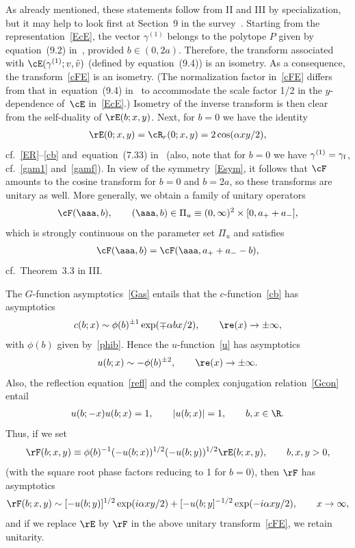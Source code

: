 As already mentioned, these statements follow from II and III by specialization, but it may help to look f\/irst at Section~9 in the survey~\cite{Rsurv}. Starting from the representation~\eqref{EcE}, the
vector $\gamma^{(1)}$ belongs to the polytope $P$ given by equation~(9.2) in~\cite{Rsurv}, provided $b\in (0,2a)$. Therefore, the transform associated with $\cE(\gamma^{(1)};v,\hat{v})$ (def\/ined by equation~(9.4)) is an isometry. As a consequence, the transform~\eqref{cFE} is an isometry. (The normalization factor in~\eqref{cFE} dif\/fers from that in~equation~(9.4) in~\cite{Rsurv} to accommodate the scale factor 1/2 in the $y$-dependence of~$\cE$ in~\eqref{EcE}.) Isometry of the inverse transform is then clear from the self-duality of $\rE(b;x,y)$. Next, for $b=0$ we have the identity
\begin{gather}\label{ER0}
\rE(0;x,y)=\cR_r(0;x,y)=2\cos(\alpha xy/2),
\end{gather}
cf.~\eqref{ER}--\eqref{cb} and~equation~(7.33) in~\cite{Rsurv} (also, note that for $b=0$ we have $\gamma^{(1)}=\gamma_{\rm f}$, cf.~\eqref{gam1} and~\eqref{gamf}). In view of the symmetry~\eqref{Esym},
it follows that $\cF$ amounts to the cosine transform for $b=0$ and $b=2a$, so these transforms are unitary as well. More generally, we obtain a family of unitary operators
\begin{gather}
\cF(\aaa,b),\qquad (\aaa,b)\in \Pi_u\equiv(0,\infty)^2\times[0,a_{+}+a_{-}],
\end{gather}
which is strongly continuous on the parameter set $\Pi_u$ and satisf\/ies
\begin{gather}\label{cFsym}
\cF(\aaa, b)=\cF(\aaa, a_{+}+a_{-}-b),
\end{gather}
cf.~Theorem~3.3 in III.

The $G$-function asymptotics~\eqref{Gas}
entails that the $c$-function~\eqref{cb} has asymptotics
\begin{gather}\label{cas}
c(b;x)\sim \phi(b)^{\pm 1}\exp(\mp \alpha bx/2),\qquad \re (x)\to\pm\infty,
\end{gather}
with $\phi(b)$ given by~\eqref{phib}. Hence the
$u$-function~\eqref{u} has asymptotics
\begin{gather}\label{uas}
u(b;x)\sim -\phi(b)^{\pm 2},\qquad \re ( x)\to  \pm\infty.
\end{gather}
Also, the ref\/lection equation~\eqref{refl} and the complex conjugation relation~\eqref{Gcon}
entail
\begin{gather}
u(b;-x)u(b;x)=1,\qquad |u(b;x)|=1,\qquad b,x\in\R.
\end{gather}
Thus, if we set
\begin{gather}\label{Fdef}
\rF(b;x,y)\equiv \phi(b)^{-1}(-u(b;x))^{1/2}(-u(b;y))^{1/2}\rE(b;x,y),\qquad b,x,y>0,
\end{gather}
(with the square root phase factors reducing to 1 for $b=0$), then $\rF$ has asymptotics
\begin{gather}\label{Fas}
\rF(b;x,y)\sim [-u(b;y)]^{1/2}\exp(i\alpha xy/2) +[-u(b;y]^{-1/2}\exp(-i\alpha xy/2),\qquad x\to \infty,
\end{gather}
and if we replace $\rE$ by $\rF$ in the above unitary transform~\eqref{cFE}, we retain unitarity.


